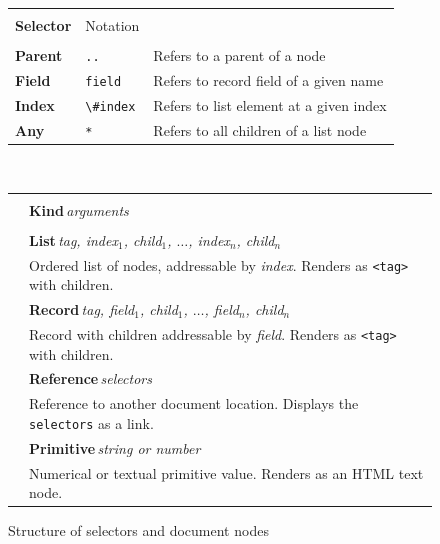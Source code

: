 \documentclass[sigconf,anonymous,screen]{acmart}
\begin{document}
\begin{figure}
\newcommand{\seltablecol}[3]{
\sffamily\small{\bfseries #2} & {\footnotesize #1} & \footnotesize #3\\
}
\newcommand{\ndtablecol}[4]{
\raisebox{-0.2em}{#1} & \sffamily\small{\bfseries #2}\,\;\textit{\footnotesize #3}\\[-0.2em]
&\sffamily\footnotesize #4\\[0.3em]
}

\begin{tabular}{|llp{18.08em}|}
\hline
\rowcolor{ekgray}
&&\\[-1em]
\rowcolor{ekgray}
\sffamily\small{\bfseries Selector} & {\sffamily\footnotesize Notation} & \\[0.2em]
\hline
&&\\[-1em]
\seltablecol{\Verb|..|}{Parent}{Refers to a parent of a node}
\seltablecol{\Verb|field|}{Field}{Refers to record field of a given name}
\seltablecol{\Verb|\#index|}{Index}{Refers to list element at a given index}
\seltablecol{\Verb|*|}{Any}{Refers to all children of a list node}
\hline
\end{tabular}

~\\[0.5em]

\begin{tabular}{|cl|}
\hline
\rowcolor{ekgray}
&\\[-1em]
\rowcolor{ekgray}
& \sffamily\small{\bfseries Kind}\;\,\textit{\footnotesize arguments} \\[0.2em]
\hline
&\\[-1em]
\ndtablecol{\faListUl}{List}{tag, index$_1$, child$_1$, $\ldots$, index$_n$, child$_n$}
  {Ordered list of nodes, addressable by \textit{index}. Renders as \Verb|<tag>| with children.}
\ndtablecol{\faFileO}{Record}{tag, field$_1$, child$_1$, $\ldots$, field$_n$, child$_n$}
  {Record with children addressable by \textit{field}. Renders as \Verb|<tag>| with children.}
\ndtablecol{\faExternalLink}{Reference}{selectors}
  {Reference to another document location. Displays the \Verb|selectors| as a link.}
\ndtablecol{\faFont}{Primitive}{string \textnormal{or} number}
  {Numerical or textual primitive value. Renders as an HTML text node.}
\hline
\end{tabular}
\vspace{-0.5em}
\caption{Structure of selectors and document nodes}
\label{fig:doc}
\vspace{-1em}
\end{figure}
\end{document}
